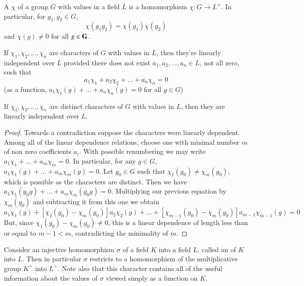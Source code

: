 \begin{defn}
    A  $\chi$ of a group $G$ with values in a field $L$ is a homomorphism $\chi:G\rightarrow L^{\times}$. In particular, for $g_1,g_2 \in G$, \begin{equation*}
        \chi(g_1g_2) = \chi(g_1)\chi(g_2)
    \end{equation*}
    and $\chi(g) \neq 0$ for all $g \in \mathbf{G}$.
\end{defn}

\begin{defn}
    If $\chi_1,\chi_2,...,\chi_n$ are characters of $G$ with values in $L$, then they're linearly independent over $L$ provided there does not exist $a_1,a_2,...,a_n \in L$, not all zero, such that \begin{equation*}
        a_1\chi_1+a_2\chi_2+...+a_n\chi_n = 0
    \end{equation*}
    (as a function, $a_1\chi_1(g)+...+a_n\chi_n(g) = 0$ for all $g \in G$)
\end{defn}


\begin{thm}
    If $\chi_1,\chi_2,...,\chi_n$ are distinct characters of $G$ with values in $L$, then they are linearly independent over $L$.
\end{thm}
\begin{proof}
    Towards a contradiction suppose the characters were linearly dependent. Among all of the linear dependence relations, choose one with minimal number $m$ of non zero coefficients $a_i$. With possible renumbering we may write $a_1\chi_1+...+a_m\chi_m = 0$. In particular, for any $g \in G$, $a_1\chi_1(g) + ... + a_m\chi_m(g) = 0$. Let $g_0 \in G$ such that $\chi_1(g_0) \neq \chi_m(g_0)$, which is possible as the characters are distinct. Then we have $a_1\chi_1(g_0g)+...+a_m\chi_m(g_0g) = 0$. Multiplying our previous equation by $\chi_m(g_0)$ and subtracting it from this one we obtain \begin{equation*}
        [\chi_1(g_0) - \chi_m(g_0)]a_1\chi_1(g)+[\chi_2(g_0)-\chi_m(g_0)]a_2\chi_2(g)+...+[\chi_{m-1}(g_0)-\chi_m(g_0)]a_{m-1}\chi_{m-1}(g) = 0
    \end{equation*}
    But, since $\chi_1(g_0) - \chi_m(g_0) \neq 0$, this is a linear dependence of length less than or equal to $m-1 < m$, contradicting the minimality of $m$.
\end{proof}
    

Consider an injective homomorphism $\sigma$ of a field $K$ into a field $L$, called an  of $K$ into $L$. Then in particular $\sigma$ restricts to a homomorphism of the multiplicative group $K^{\times}$ into $L^{\times}$. Note also that this character contains all of the useful information about the values of $\sigma$ viewed simply as a function on $K$.

